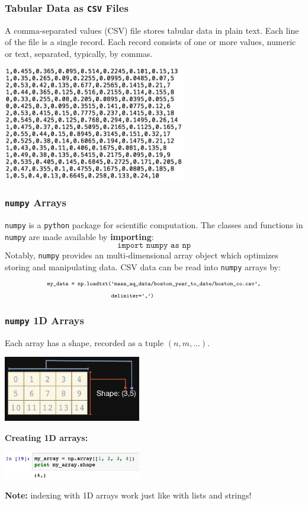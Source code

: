 \documentclass[12pt,t]{beamer}
\begin{document}
\begin{frame}  
  \frametitle{Tabular Data as \texttt{CSV} Files}
  \vskip-0.4cm
A comma-separated values (CSV) file stores tabular data in plain text. Each line of the file is a single record. Each record consists of one or more values, numeric or text, separated, typically, by commas. 
\begin{center}
\includegraphics[width=80mm]{csv}
\end{center}
\end{frame}

\begin{frame}  
  \frametitle{\texttt{numpy} Arrays}
  \vskip-0.4cm
\texttt{numpy} is a \texttt{python} package for scientific computation. The classes and functions in \texttt{numpy} are made available by \textbf{importing}:
\[
\texttt{import numpy as np}
\]
\vskip0.1cm
Notably, \texttt{numpy} provides an multi-dimensional array object which optimizes storing and manipulating data.  
\vskip0.3cm
CSV data can be read into \texttt{numpy} arrays by:
\begin{align*}
\scriptsize
\texttt{my\_data = np.loadtxt(}&\scriptsize\texttt{'mass\_aq\_data/boston\_year\_to\_date/boston\_co.csv',}\\
&\scriptsize\texttt{delimiter=',')}
\end{align*}
\end{frame}

\begin{frame}  
  \frametitle{\texttt{numpy} 1D Arrays}
\vskip-0.2cm 
Each array has a shape, recorded as a tuple $(n, m, ...)$.
\begin{center}
\includegraphics[width=60mm]{shape}
\end{center}
\textbf{Creating 1D arrays:}
\begin{center}
\includegraphics[width=60mm]{create_1d}
\end{center}
\textbf{Note:} indexing with 1D arrays work just like with lists and strings!
\end{frame}
\end{document}
